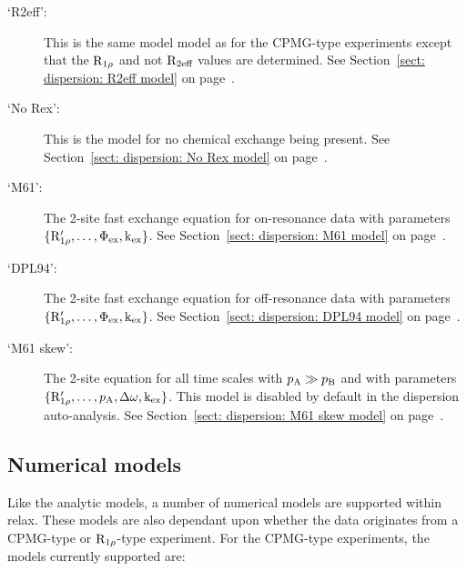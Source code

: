 \begin{description}
\item[`R2eff':]  This is the same model model as for the CPMG-type experiments except that the $\mathrm{R}_{1\rho}$ and not $\mathrm{R}_{2\textrm{eff}}$ values are determined.  See Section~\ref{sect: dispersion: R2eff model} on page~\pageref{sect: dispersion: R2eff model}.
\item[`No Rex':]  This is the model for no chemical exchange being present.  See Section~\ref{sect: dispersion: No Rex model} on page~\pageref{sect: dispersion: No Rex model}.
\item[`M61':]  The \citet{Meiboom61} 2-site fast exchange equation for on-resonance data with parameters $\{\mathrm{R}_{1\rho}', \dots, \Phi_\textrm{ex}, \textrm{k}_\textrm{ex}\}$.  See Section~\ref{sect: dispersion: M61 model} on page~\pageref{sect: dispersion: M61 model}.
\item[`DPL94':]  The \citet{Davis94} 2-site fast exchange equation for off-resonance data with parameters $\{\mathrm{R}_{1\rho}', \dots, \Phi_\textrm{ex}, \textrm{k}_\textrm{ex}\}$.  See Section~\ref{sect: dispersion: DPL94 model} on page~\pageref{sect: dispersion: DPL94 model}.
\item[`M61 skew':]  The \citet{Meiboom61} 2-site equation for all time scales with $p_\textrm{A} \gg p_\textrm{B}$ and with parameters $\{\mathrm{R}_{1\rho}', \dots, p_\textrm{A}, \Delta\omega, \textrm{k}_\textrm{ex}\}$.  This model is disabled by default in the dispersion auto-analysis.  See Section~\ref{sect: dispersion: M61 skew model} on page~\pageref{sect: dispersion: M61 skew model}.
\end{description}




\subsection{Numerical models}
\label{sect: dispersion: numerical models}

Like the analytic models, a number of numerical models are supported within relax.
These models are also dependant upon whether the data originates from a CPMG-type or $\mathrm{R}_{1\rho}$-type experiment.
For the CPMG-type experiments, the models currently supported are:

